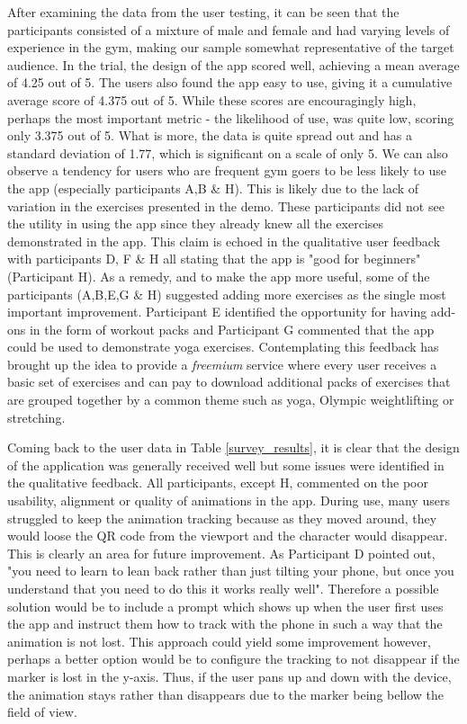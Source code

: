 \documentclass{l4proj}
\begin{document}
After examining the data from the user testing, it can be seen that the participants consisted of a mixture of male and female and had varying levels of experience in the gym, making our sample somewhat representative of the target audience. In the trial, the design of the app scored well, achieving a mean average of 4.25 out of 5. The users also found the app easy to use, giving it a cumulative average score of 4.375 out of 5. While these scores are encouragingly high, perhaps the most important metric - the likelihood of use, was quite low, scoring only 3.375 out of 5. What is more, the data is quite spread out and has a standard deviation of 1.77, which is significant on a scale of only 5. We can also observe a tendency for users who are frequent gym goers to be less likely to use the app (especially participants A,B \& H). This is likely due to the lack of variation in the exercises presented in the demo. These participants did not see the utility in using the app since they already knew all the exercises demonstrated in the app. This claim is echoed in the qualitative user feedback with participants D, F \& H all stating that the app is "good for beginners" (Participant H). As a remedy, and to make the app more useful, some of the participants (A,B,E,G \& H) suggested adding more exercises as the single most important improvement. Participant E identified the opportunity for having add-ons in the form of workout packs and Participant G commented that the app could be used to demonstrate yoga exercises. Contemplating this feedback has brought up the idea to provide a \textit{freemium} service where every user receives a basic set of exercises and can pay to download additional packs of exercises that are grouped together by a common theme such as yoga, Olympic weightlifting or stretching. 

Coming back to the user data in Table \ref{survey_results}, it is clear that the design of the application was generally received well but some issues were identified in the qualitative feedback. All participants, except H, commented on the poor usability, alignment or quality of animations in the app. During use, many users struggled to keep the animation tracking because as they moved around, they would loose the QR code from the viewport and the character would disappear. This is clearly an area for future improvement. As Participant D pointed out, "you need to learn to lean back rather than just tilting your phone, but once you understand that you need to do this it works really well". Therefore a possible solution would be to include a prompt which shows up when the user first uses the app and instruct them how to track with the phone in such a way that the animation is not lost. This approach could yield some improvement however, perhaps a better option would be to configure the tracking to not disappear if the marker is lost in the y-axis. Thus, if the user pans up and down with the device, the animation stays rather than disappears due to the marker being bellow the field of view. 
\end{document}
